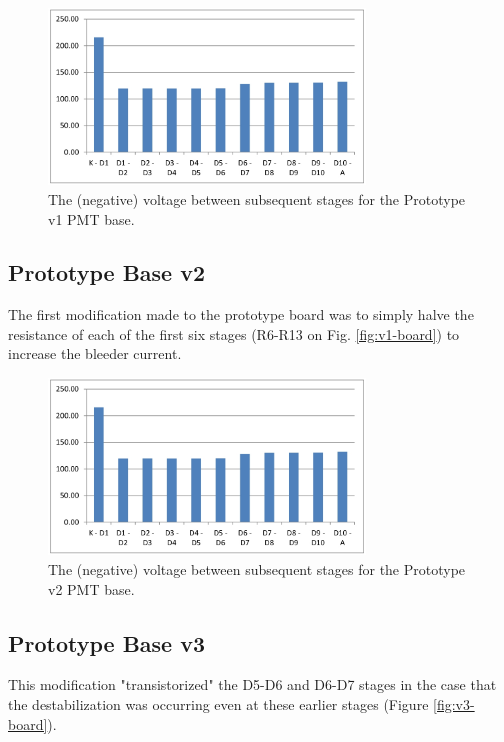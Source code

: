 \begin{figure}[h]
	\centerline{
		\mbox{\includegraphics[width=0.75\textwidth]{figures/v2-volt.jpg}}
	}
	\caption{The (negative) voltage between subsequent stages for the Prototype v1 PMT base.}
	\label{fig:v1-volt}
\end{figure}
\newpage

\subsection{Prototype Base v2}

The first modification made to the prototype board was to simply halve the resistance of each of the first six stages (R6-R13 on Fig. \ref{fig:v1-board}) to increase the bleeder current.

\begin{figure}[h]
	\centerline{
		\mbox{\includegraphics[width=0.75\textwidth]{figures/v2-volt.jpg}}
	}
	\caption{The (negative) voltage between subsequent stages for the Prototype v2 PMT base.}
	\label{fig:v2-volt}
\end{figure}
\newpage

\subsection{Prototype Base v3}

This modification "transistorized" the D5-D6 and D6-D7 stages in the case that the destabilization was occurring even at these earlier stages (Figure \ref{fig:v3-board}).

